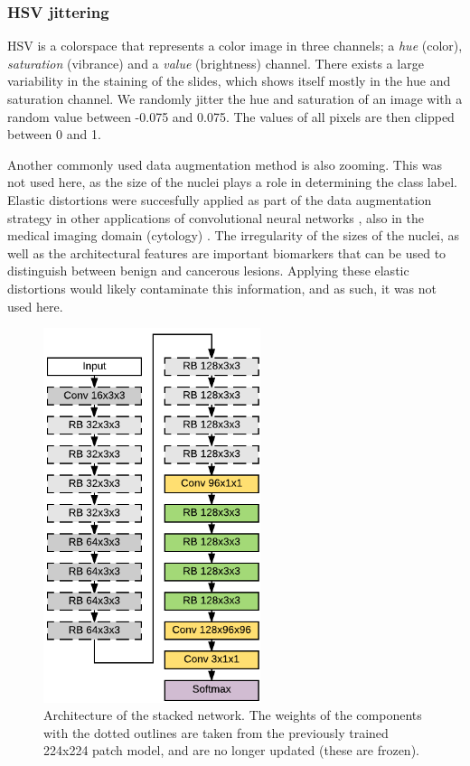 \documentclass[journal]{IEEEtran}
\begin{document}
\subsubsection{HSV jittering}
HSV is a colorspace that represents a color image in three channels; a \emph{hue} (color), \emph{saturation} (vibrance) and a \emph{value} (brightness) channel. There exists a large variability in the staining of the slides, which shows itself mostly in the hue and saturation channel. We randomly jitter the hue and saturation of an image with a random value between -0.075 and 0.075. The values of all pixels are then clipped between 0 and 1.

\medskip

Another commonly used data augmentation method is also zooming. This was not used here, as the size of the nuclei plays a role in determining the class label. Elastic distortions were succesfully applied as part of the data augmentation strategy in other applications of convolutional neural networks \cite{elastransforms}, also in the medical imaging domain (cytology) \cite{unet}. The irregularity of the sizes of the nuclei, as well as the architectural features are important biomarkers that can be used to distinguish between benign and cancerous lesions. Applying these elastic distortions would likely contaminate this information, and as such, it was not used here.




\begin{figure}[!t]
\centering{}
\includegraphics[width=2.5in]{architecture_stacked}
\caption{Architecture of the stacked network. The weights of the components with the dotted outlines are taken from the previously trained 224x224 patch model, and are no longer updated (these are frozen).}
\label{fig_stacked}
\end{figure}
\end{document}
